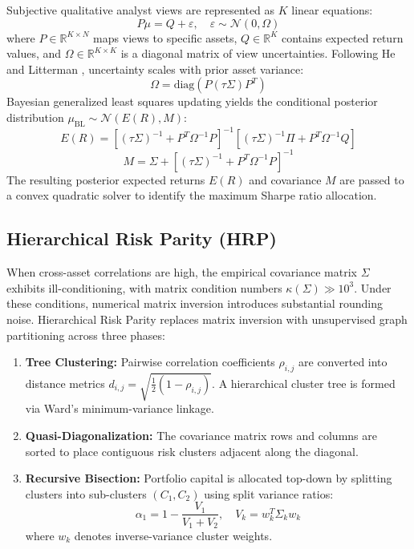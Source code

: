 \documentclass[conference]{IEEEtran}
\begin{document}
Subjective qualitative analyst views are represented as $K$ linear equations:
\begin{equation}
P \mu = Q + \varepsilon, \quad \varepsilon \sim \mathcal{N}(0, \Omega)
\label{eq:bl_views}
\end{equation}
where $P \in \mathbb{R}^{K \times N}$ maps views to specific assets, $Q \in \mathbb{R}^K$ contains expected return values, and $\Omega \in \mathbb{R}^{K \times K}$ is a diagonal matrix of view uncertainties. Following He and Litterman \cite{he1999}, uncertainty scales with prior asset variance:
\begin{equation}
\Omega = \text{diag}\left(P (\tau \Sigma) P^T\right)
\label{eq:omega}
\end{equation}
Bayesian generalized least squares updating yields the conditional posterior distribution $\mu_{\text{BL}} \sim \mathcal{N}(E(R), M)$:
\begin{equation}
E(R) = \left[(\tau \Sigma)^{-1} + P^T \Omega^{-1} P\right]^{-1} \left[(\tau \Sigma)^{-1} \Pi + P^T \Omega^{-1} Q\right]
\label{eq:bl_posterior}
\end{equation}
\begin{equation}
M = \Sigma + \left[(\tau \Sigma)^{-1} + P^T \Omega^{-1} P\right]^{-1}
\label{eq:bl_cov}
\end{equation}
The resulting posterior expected returns $E(R)$ and covariance $M$ are passed to a convex quadratic solver to identify the maximum Sharpe ratio allocation.

\subsection{Hierarchical Risk Parity (HRP)}

When cross-asset correlations are high, the empirical covariance matrix $\Sigma$ exhibits ill-conditioning, with matrix condition numbers $\kappa(\Sigma) \gg 10^3$. Under these conditions, numerical matrix inversion introduces substantial rounding noise. Hierarchical Risk Parity \cite{prado2016} replaces matrix inversion with unsupervised graph partitioning across three phases:
\begin{enumerate}
    \item \textbf{Tree Clustering:} Pairwise correlation coefficients $\rho_{i,j}$ are converted into distance metrics $d_{i,j} = \sqrt{\frac{1}{2}(1 - \rho_{i,j})}$. A hierarchical cluster tree is formed via Ward's minimum-variance linkage.
    \item \textbf{Quasi-Diagonalization:} The covariance matrix rows and columns are sorted to place contiguous risk clusters adjacent along the diagonal.
    \item \textbf{Recursive Bisection:} Portfolio capital is allocated top-down by splitting clusters into sub-clusters $(C_1, C_2)$ using split variance ratios:
    \begin{equation}
    \alpha_1 = 1 - \frac{V_1}{V_1 + V_2}, \quad V_k = w_k^T \Sigma_k w_k
    \label{eq:hrp_bisection}
    \end{equation}
    where $w_k$ denotes inverse-variance cluster weights.
\end{enumerate}
\end{document}
